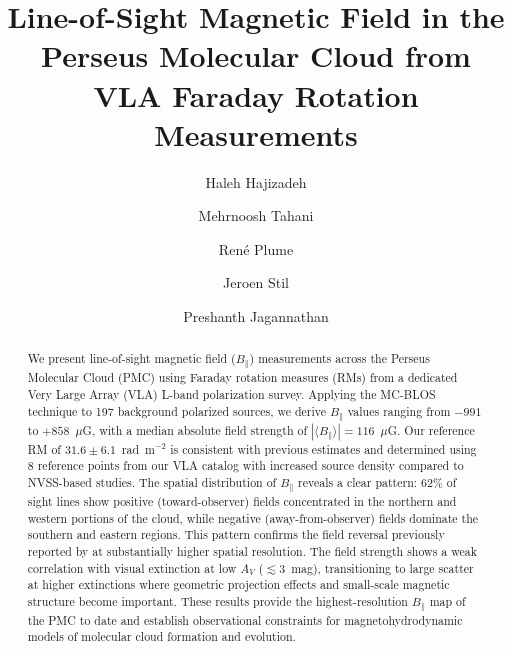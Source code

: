 \documentclass[twocolumn]{aastex701}
\begin{document}
\title{Line-of-Sight Magnetic Field in the Perseus Molecular Cloud from VLA Faraday Rotation Measurements}

\author{Haleh Hajizadeh}

\author{Mehrnoosh Tahani}

\author{Ren\'e Plume}

\author{Jeroen Stil}

\author{Preshanth Jagannathan}

\begin{abstract}
We present line-of-sight magnetic field ($B_\parallel$) measurements across the Perseus Molecular Cloud (PMC) using Faraday rotation measures (RMs) from a dedicated Very Large Array (VLA) L-band polarization survey. Applying the MC-BLOS technique to 197 background polarized sources, we derive $B_\parallel$ values ranging from $-991$ to $+858$~$\mu$G, with a median absolute field strength of $|\langle B_\parallel \rangle| = 116$~$\mu$G. Our reference RM of $31.6 \pm 6.1$~rad~m$^{-2}$ is consistent with previous estimates and determined using 8 reference points from our VLA catalog with increased source density compared to NVSS-based studies. The spatial distribution of $B_\parallel$ reveals a clear pattern: 62\% of sight lines show positive (toward-observer) fields concentrated in the northern and western portions of the cloud, while negative (away-from-observer) fields dominate the southern and eastern regions. This pattern confirms the field reversal previously reported by \citet{tahani2018} at substantially higher spatial resolution. The field strength shows a weak correlation with visual extinction at low $A_V$ ($\lesssim 3$~mag), transitioning to large scatter at higher extinctions where geometric projection effects and small-scale magnetic structure become important. These results provide the highest-resolution $B_\parallel$ map of the PMC to date and establish observational constraints for magnetohydrodynamic models of molecular cloud formation and evolution.
\end{abstract}
\end{document}

